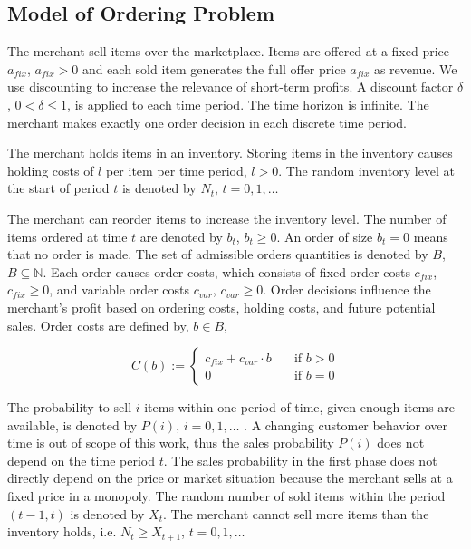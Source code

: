 \subsection{Model of Ordering Problem}
\label{subs:ordering_model}
The merchant sell items over the marketplace.
Items are offered at a fixed price $a_{fix}$, $a_{fix} > 0$ and each sold item generates the full offer price $a_{fix}$ as revenue.
We use discounting to increase the relevance of short-term profits.
A discount factor $\delta$, $0 < \delta \leq 1$, is applied to each time period.
The time horizon is infinite.
The merchant makes exactly one order decision in each discrete time period.

The merchant holds items in an inventory.
Storing items in the inventory causes holding costs of $l$ per item per time period, $l > 0$.
The random inventory level at the start of period $t$ is denoted by $N_t$, $t = 0, 1, \ldots$

The merchant can reorder items to increase the inventory level.
The number of items ordered at time $t$ are denoted by $b_t$, $b_t \geq 0$.
An order of size $b_t = 0$ means that no order is made.
The set of admissible orders quantities is denoted by $B$, $B \subseteq  \mathbb{N}$.
Each order causes order costs, which consists of fixed order costs $c_{fix}$, $c_{fix} \geq 0$, and variable order costs $c_{var}$, $c_{var} \geq 0$.
Order decisions influence the merchant's profit based on ordering costs, holding costs, and future potential sales.
Order costs are defined by, $b \in B$,

\begin{equation}
\label{eq:order_cost}
C(b) := \begin{cases}
	c_{fix} + c_{var} \cdot b  & \quad \text{if } b > 0 \\
	0  & \quad \text{if } b = 0
\end{cases}
\end{equation}

The probability to sell $i$ items within one period of time, given enough items are available, is denoted by $P(i)$, $i = 0, 1, \ldots$ .
A changing customer behavior over time is out of scope of this work, thus the sales probability $P(i)$ does not depend on the time period $t$.
The sales probability in the first phase does not directly depend on the price or market situation because the merchant sells at a fixed price in a monopoly.
The random number of sold items within the period $(t-1, t)$ is denoted by $X_t$.
The merchant cannot sell more items than the inventory holds, i.e. $N_t \geq X_{t+1}$, $t = 0, 1, \ldots$

